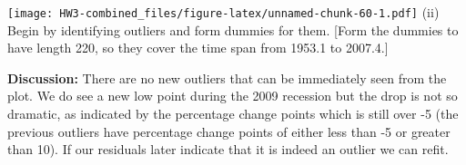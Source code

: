 \documentclass[
]{article}
\newenvironment{Shaded}{\begin{snugshade}}{\end{snugshade}}
\newcommand{\AttributeTok}[1]{\textcolor[rgb]{0.77,0.63,0.00}{#1}}
\newcommand{\ConstantTok}[1]{\textcolor[rgb]{0.00,0.00,0.00}{#1}}
\newcommand{\DecValTok}[1]{\textcolor[rgb]{0.00,0.00,0.81}{#1}}
\newcommand{\FloatTok}[1]{\textcolor[rgb]{0.00,0.00,0.81}{#1}}
\newcommand{\FunctionTok}[1]{\textcolor[rgb]{0.00,0.00,0.00}{#1}}
\newcommand{\NormalTok}[1]{#1}
\newcommand{\SpecialCharTok}[1]{\textcolor[rgb]{0.00,0.00,0.00}{#1}}
\newcommand{\StringTok}[1]{\textcolor[rgb]{0.31,0.60,0.02}{#1}}
\begin{document}
\begin{Shaded}
\end{Shaded}

\texttt{[image: HW3-combined\_files/figure-latex/unnamed-chunk-60-1.pdf]}
(ii) Begin by identifying outliers and form dummies for them. {[}Form
the dummies to have length 220, so they cover the time span from 1953.1
to 2007.4.{]}

\textbf{Discussion:} There are no new outliers that can be immediately
seen from the plot. We do see a new low point during the 2009 recession
but the drop is not so dramatic, as indicated by the percentage change
points which is still over -5 (the previous outliers have percentage
change points of either less than -5 or greater than 10). If our
residuals later indicate that it is indeed an outlier we can refit.
\end{document}
